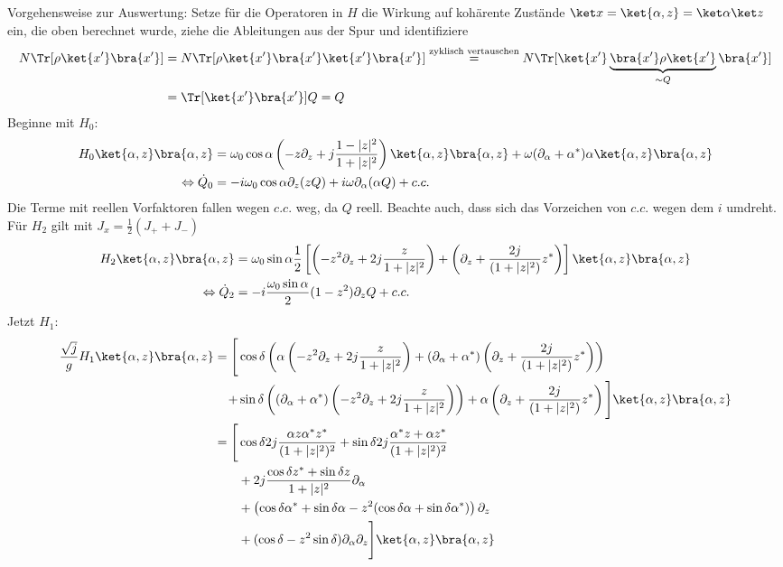 Vorgehensweise zur Auswertung: Setze für die Operatoren in $H$ die Wirkung auf kohärente Zustände $\ket x = \ket{\alpha,z} = \ket\alpha\ket z$ ein, die oben berechnet wurde, ziehe die Ableitungen aus der Spur und identifiziere
\begin{align*}
  N \Tr[\rho \ket{x'} \bra{x'}] &= N\Tr[\rho \ket{x'} \bra{x'} \ket{x'} \bra{x'}] \overset{\text{zyklisch vertauschen}}{=} N \Tr[\ket{x'} \underbrace{\bra{x'}\rho \ket{x'}}_{\sim Q} \bra{x'}] \\
  &= \Tr[\ket{x'} \bra{x'}] Q = Q
\end{align*}
Beginne mit $H_0$:
\begin{align*}
  H_0 \ket{\alpha,z}\bra{\alpha,z} &= \omega_0\cos\alpha \left(- z\partial_z + j\frac{1-|z|^2}{1+|z|^2} \right) \ket{\alpha,z}\bra{\alpha,z} + \omega (\partial_\alpha + \alpha^*)\alpha\ket{\alpha,z}\bra{\alpha,z}\\
  \Leftrightarrow \dot Q_0 &= - i \omega_0 \cos\alpha \partial_z(zQ) + i\omega\partial_\alpha(\alpha Q) + c.c.
\end{align*}
Die Terme mit reellen Vorfaktoren fallen wegen $c.c.$ weg, da $Q$ reell. Beachte auch, dass sich das Vorzeichen von $c.c.$ wegen dem $i$ umdreht. 
Für $H_2$ gilt mit $J_x = \frac12 (J_+ + J_-)$
\begin{align*}
  H_2 \ket{\alpha,z}\bra{\alpha,z} &= \omega_0\sin\alpha \frac12 \left[ \left(- z^2\partial_z + 2j \frac{z}{1+|z|^2}\right) + \left( \partial_z + \frac{2j}{(1+|z|^2)} z^*\right) \right] \ket{\alpha,z}\bra{\alpha,z}\\
  \Leftrightarrow \dot Q_2 &= - i \frac{\omega_0\sin\alpha}{2} (1-z^2)\partial_zQ + c.c.
\end{align*}
Jetzt $H_1$:
\begin{align*}
  \frac{\sqrt{j}}{g} H_1 \ket{\alpha,z}\bra{\alpha,z} = \Bigg[&\cos\delta\left(\alpha \left(- z^2\partial_z + 2j \frac{z}{1+|z|^2}\right) + (\partial_\alpha + \alpha^*)\left( \partial_z + \frac{2j}{(1+|z|^2)} z^*\right)\right)\\
		+& \sin\delta \left(   (\partial_\alpha + \alpha^*) \left(- z^2\partial_z + 2j \frac{z}{1+|z|^2}\right)\right) + \alpha \left( \partial_z + \frac{2j}{(1+|z|^2)} z^*\right) \Bigg]\ket{\alpha,z}\bra{\alpha,z}\\
  =\Bigg[ &\cos\delta 2j \frac{\alpha z \alpha^* z^*}{(1+|z|^2)^2} + \sin\delta 2j\frac{\alpha^* z + \alpha z^*}{(1+|z|^2)^2}\\
  &+ 2j\frac{\cos\delta z^* + \sin \delta z}{1+|z|^2} \partial_\alpha \\
  &+ \left(\cos\delta \alpha^* + \sin \delta \alpha - z^2 (\cos\delta  \alpha + \sin \delta \alpha^*)\right)\partial_z\\
  &+ (\cos\delta - z^2\sin\delta)\partial_\alpha \partial_z \Bigg] \ket{\alpha,z}\bra{\alpha,z}
\end{align*}
